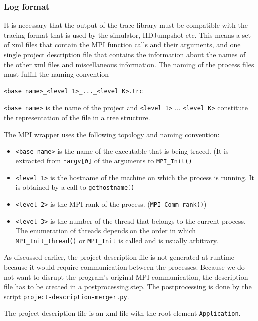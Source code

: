 \documentclass[a4paper,12pt,pdftex]{scrartcl}
\begin{document}
\subsubsection{Log format}
It is necessary that the output of the trace library must be
compatible with the tracing format that is used by the simulator,
HDJumpshot etc. This means a set of xml files that contain the MPI
function calls and their arguments, and one single project description
file that contains the information about the names of the other xml
files and miscellaneous information. The naming of the process files
must fulfill the naming convention
\begin{lstlisting}
<base name>_<level 1>_..._<level K>.trc
\end{lstlisting}
\verb/<base name>/ is the name of the project and \verb/<level 1>/
... \verb/<level K>/ constitute the representation of the file in a tree
structure.

The MPI wrapper uses the following topology and naming convention:
\begin{itemize}
\item \verb/<base name>/ is the name of the executable that is being
  traced. (It is extracted from \verb/*argv[0]/ of the arguments to
  \verb/MPI_Init()/
\item \verb/<level 1>/ is the hostname of the machine on which the
  process is running. It is obtained by a call to \verb/gethostname()/
\item \verb/<level 2>/ is the MPI rank of the
  process. (\verb/MPI_Comm_rank()/)
\item \verb/<level 3>/ is the number of the thread that belongs to the
  current process. The enumeration of threads depends on the order in
  which \verb/MPI_Init_thread()/ or \verb/MPI_Init/ is called and is
  usually arbitrary.
\end{itemize}

As discussed earlier, the project description file is not generated at
runtime because it would require communication between the
processes. Because we do not want to disrupt the program's original
MPI communication, the description file has to be created in a
postprocessing step. The postprocessing is done by the script
\verb/project-description-merger.py/. 

The project description file is an xml file with the root element
\verb/Application/. 
\end{document}
